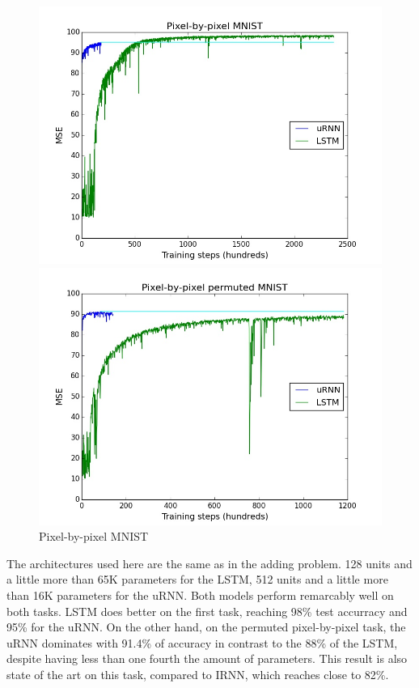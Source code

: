 \documentclass{article} %
\begin{document}
\begin{figure}[ht] 
  \label{ fig3} 
  \begin{minipage}[b]{0.5\linewidth}
    \centering
    \includegraphics[scale=0.25]{figures/mnist.jpeg}
    \vspace{4ex}
  \end{minipage}%
  \begin{minipage}[b]{0.5\linewidth}
    \centering
    \includegraphics[scale=0.25]{figures/mnist_perm.jpeg}
    \vspace{4ex}
  \end{minipage}
  \caption{Pixel-by-pixel MNIST}
\end{figure}

The architectures used here are the same as in the adding problem. 128 units and a little more than 65K parameters for the LSTM, 512 units and a little more than 16K parameters for the uRNN. Both models perform remarcably well on both tasks. LSTM does better on the first task, reaching 98\% test accurracy and 95\% for the uRNN. On the other hand, on the permuted pixel-by-pixel task, the uRNN dominates with 91.4\% of accuracy in contrast to the 88\% of the LSTM, despite having less than one fourth the amount of parameters. This result is also state of the art on this task, compared to \cite{Quoc2015} IRNN, which reaches close to 82\%.
\end{document}
